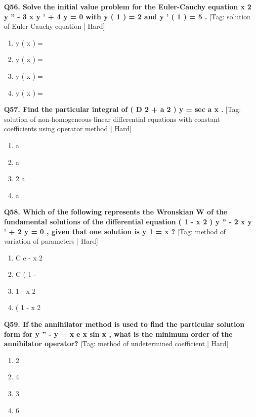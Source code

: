 \noindent\textbf{Q56. Solve the initial value problem for the Euler-Cauchy equation x 2 y '' - 3 x y ' + 4 y = 0 with y ( 1 ) = 2 and y ' ( 1 ) = 5 .} \hfill [Tag: solution of Euler-Cauchy equation | Hard]
\begin{enumerate}[label=(\alph*),topsep=2pt,itemsep=1pt,partopsep=0pt,parsep=0pt]
    \item {{y ( x ) =}}
    \item {{y ( x ) =}}
    \item {{y ( x ) =}}
    \item {{y ( x ) =}}
\end{enumerate}
\vspace{2mm}

\noindent\textbf{Q57. Find the particular integral of ( D 2 + a 2 ) y = sec a x .} \hfill [Tag: solution of non-homogeneous linear differential equations with constant coefficients using operator method | Hard]
\begin{enumerate}[label=(\alph*),topsep=2pt,itemsep=1pt,partopsep=0pt,parsep=0pt]
    \item {{a}}
    \item {{a}}
    \item {{2 a}}
    \item {{a}}
\end{enumerate}
\vspace{2mm}

\noindent\textbf{Q58. Which of the following represents the Wronskian W of the fundamental solutions of the differential equation ( 1 - x 2 ) y '' - 2 x y ' + 2 y = 0 , given that one solution is y 1 = x ?} \hfill [Tag: method of variation of parameters | Hard]
\begin{enumerate}[label=(\alph*),topsep=2pt,itemsep=1pt,partopsep=0pt,parsep=0pt]
    \item {{C e - x 2}}
    \item {{C ( 1 -}}
    \item {{1 - x 2}}
    \item {{( 1 - x 2}}
\end{enumerate}
\vspace{2mm}

\noindent\textbf{Q59. If the annihilator method is used to find the particular solution form for y '' - y = x e x sin x , what is the minimum order of the annihilator operator?} \hfill [Tag: method of undetermined coefficient | Hard]
\begin{enumerate}[label=(\alph*),topsep=2pt,itemsep=1pt,partopsep=0pt,parsep=0pt]
    \item {{2}}
    \item {{4}}
    \item {{3}}
    \item {{6}}
\end{enumerate}
\vspace{2mm}

